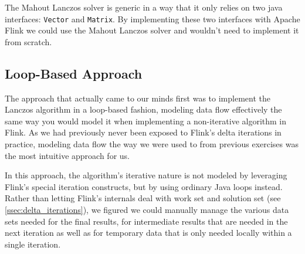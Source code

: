The Mahout Lanczos solver is generic in a way that it only relies on two java
interfaces: \texttt{Vector} and \texttt{Matrix}. By implementing these two
interfaces with Apache Flink we could use the Mahout Lanczos solver and
wouldn't need to implement it from scratch.






\subsection{Loop-Based Approach}
\label{ssec:loop_approach}

The approach that actually came to our minds first was to implement the Lanczos
algorithm in a loop-based fashion, modeling data flow effectively the same way
you would model it when implementing a non-iterative algorithm in Flink. As we
had previously never been exposed to Flink's delta iterations in practice,
modeling data flow the way we were used to from previous exercises was the most
intuitive approach for us.

In this approach, the algorithm's iterative nature is not modeled by leveraging
Flink's special iteration constructs, but by using ordinary Java loops instead.
Rather than letting Flink's internals deal with work set and solution set (see
\ref{ssec:delta_iterations}), we figured we could manually manage the various
data sets needed for the final results, for intermediate results that are
needed in the next iteration as well as for temporary data that is only needed
locally within a single iteration.

